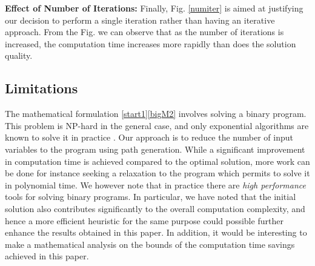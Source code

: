 \documentclass[journal]{IEEEtran}
\begin{document}
\noindent \textbf{Effect of Number of Iterations:} Finally, Fig. \ref{numiter} is aimed at justifying our decision to perform a single iteration rather than having an iterative approach. From the Fig. we can observe that as the number of iterations is increased, the computation time increases more rapidly than does the solution quality.

\subsection{Limitations}
The mathematical formulation \eqref{start1}\eqref{bigM2} involves solving a binary program. This problem is NP-hard in the general case, and only exponential algorithms are known to solve it in practice \cite{Woeginger03}. Our approach is to reduce the number of input variables to the program using path generation. While a significant improvement in computation time is achieved compared to the optimal solution, more work can be done for instance seeking a relaxation to the program which permits to solve it in polynomial time. We however note that in practice there are \emph{high performance} tools \cite{CPLEX12.4} for solving binary programs. In particular, we have noted that the initial solution also contributes significantly to the overall computation complexity, and hence a more efficient heuristic for the same purpose could possible further enhance the results obtained in this paper. In addition, it would be interesting to make a mathematical analysis on the bounds of the computation time savings achieved in this paper.
\end{document}
